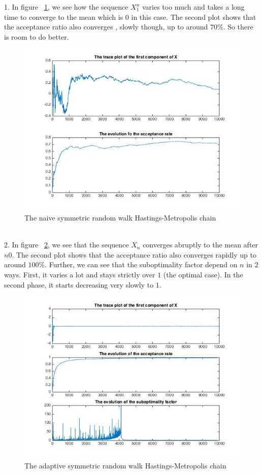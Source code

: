 1.  In figure ~\ref{nrwHM}, we see how the sequence $X^n_1$ varies too much and takes a long time to converge to the mean which is $0$ in this case. The second plot shows that the acceptance ratio also converges , slowly though, up to around $70\%$. So there is room to do better.
\begin{figure}
	\centering
	\includegraphics[scale=.5]{figures/nrwHM}
	\caption{The naive symmetric random walk Hastings-Metropolis chain}
	\label{nrwHM}
\end{figure}
~\\

2.  In figure ~\ref{arwHM}, we see that the sequence $X_n$ converges abruptly to the mean after $n0$. The second plot shows that the acceptance ratio also converges rapidly up to around $100\%$. Further, we can see that the suboptimality factor depend on $n$ in $2$ ways. First, it varies a lot and stays strictly over $1$ (the optimal case). In the second phase, it starts decreasing very slowly to $1$.
\begin{figure}
	\centering
	\includegraphics[scale=.5]{figures/arwHM}
	\caption{The adaptive symmetric random walk Hastings-Metropolis chain}
	\label{arwHM}
\end{figure}
~\\


